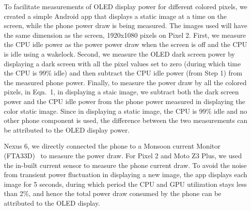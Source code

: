 To facilitate measurements of OLED display power for different colored
pixels, we created a simple Android app that displays a static image
at a time on the screen, while the phone power draw is being measured.
The images used will have the same dimension as the screen, \eg
1920x1080 pixels on Pixel 2.
First, we measure the CPU idle power 
as the power power draw when the screen is off and the CPU is idle using a wakelock.
Second, we measure the OLED dark screen power 
by displaying a dark screen with all the pixel values set to zero
(during which time the CPU is 99\% idle)
and then subtract the CPU idle power (from Step 1) from the measured phone power.
Finally, to measure the power draw by all the colored pixels,
\ie {}  in Eqn.~1,
in displaying a staic image, we subtract both the dark
screen power and the CPU idle power
from the phone power measured in displaying the color static image.
Since in displaying a static image, the CPU
is 99\% idle and no other phone component is used, the difference
between the two measurements can be attributed to the OLED display power.
\fi



Nexus 6, we directly connected the phone to a Monsoon current
Monitor (FTA33D)~\cite{monsoon} to measure the power draw.  For Pixel
2 and Moto Z3 Plus, we used the in-built current sensor to measure the
phone current draw.  To avoid the noise from transient power
fluctuation in displaying a new image, the app displays each image for
5 seconds, during which period the CPU and GPU utilization stays less
than 2\%, and hence the
total power draw consumed by the phone can be attributed to the OLED
display.
\fi

